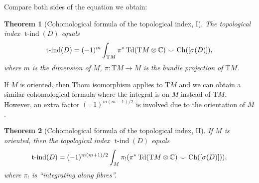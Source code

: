 \documentclass[reqno]{scrartcl}
\newtheorem{theorem}{Theorem}[section]
\theoremstyle{definition}
\theoremstyle{remark}
\newcommand{\tind}{\operatorname{t-ind}}
\renewcommand{\cup}{\smile}
\begin{document}
Compare both sides of the equation we obtain:
\begin{theorem}[Cohomological formula of the topological index, I]
The topological index $\tind(D)$ equals
\[ \tind(D)=(-1)^m\int_{\mathrm{T}M}\pi^*\Td(\mathrm{T}M\otimes\C)\cup\Ch([\sigma(D)]), \]
where $m$ is the dimension of $M$, $\pi\colon \mathrm{T}M\to M$ is the bundle projection of $\mathrm{T}M$.
\end{theorem}

If $M$ is oriented, then Thom isomorphism applies to $\mathrm{T}M$ and we can obtain a similar cohomological formula where the integral is on $M$ instead of $\mathrm{T}M$. However, an extra factor $(-1)^{m(m-1)/2}$ is involved due to the orientation of $M$.

\begin{theorem}[Cohomological formula of the topological index, II]
If $M$ is oriented, then the topological index $\tind(D)$ equals
\[ \tind(D)=(-1)^{m(m+1)/2}\int_{M}\pi_!(\pi^*\Td(\mathrm{T}M\otimes\C)\cup\Ch([\sigma(D)])), \]
where $\pi_!$ is ``integrating along fibres''.
\end{theorem}
\end{document}
